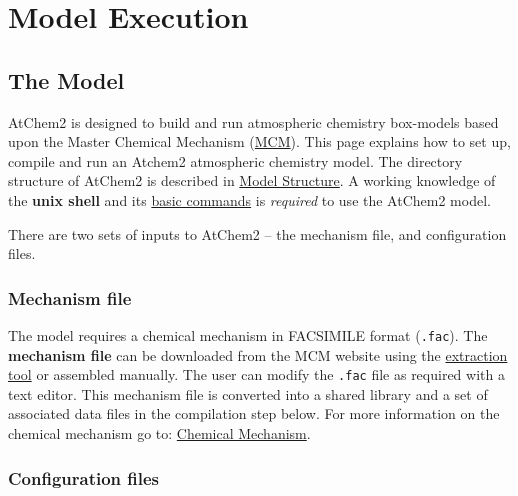 %
%
%
%

\chapter{Model Execution} \label{ch:execution}

\section{The Model} \label{sec:model}

AtChem2 is designed to build and run atmospheric chemistry box-models
based upon the Master Chemical Mechanism
(\href{http://mcm.leeds.ac.uk/MCM/}{MCM}). This page explains how to
set up, compile and run an Atchem2 atmospheric chemistry model. The
directory structure of AtChem2 is described in
\hyperref[sec:model-structure]{Model Structure}. A working knowledge
of the \textbf{unix shell} and its
\href{https://swcarpentry.github.io/shell-novice/reference/}{basic
  commands} is \emph{required} to use the AtChem2 model.

There are two sets of inputs to AtChem2 -- the mechanism file, and
configuration files.

\subsection{Mechanism file} \label{subsec:mechanism-file}

The model requires a chemical mechanism in FACSIMILE format
(\texttt{.fac}). The \textbf{mechanism file} can be downloaded from
the MCM website using the
\href{http://mcm.leeds.ac.uk/MCM/extract.htt}{extraction tool}
or assembled manually. The user can modify the \texttt{.fac} file as
required with a text editor. This mechanism file is converted into a
shared library and a set of associated data files in the compilation
step below. For more information on the chemical mechanism go to:
\hyperref[sec:chemical-mechanism]{Chemical Mechanism}.

\subsection{Configuration files} \label{subsec:configuration-files}

